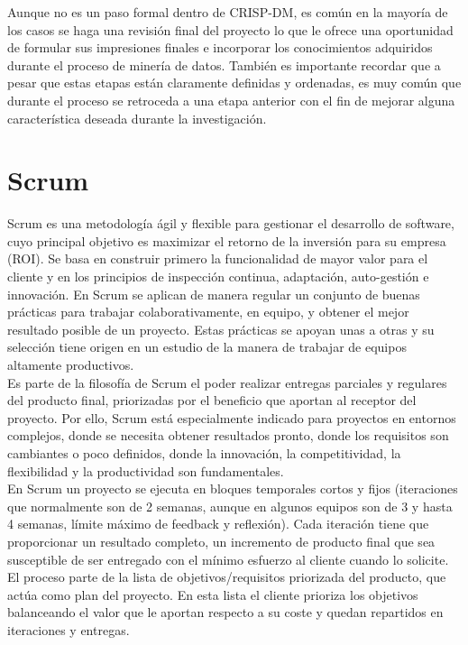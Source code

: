 Aunque no es un paso formal dentro de CRISP-DM, es común en la mayoría de los casos se haga una revisión final del proyecto lo que le ofrece una oportunidad de formular sus impresiones finales e incorporar los conocimientos adquiridos durante el proceso de minería de datos. También es importante recordar que a pesar que estas etapas están claramente definidas  y ordenadas, es muy común que durante el proceso se retroceda a una etapa anterior con el fin de mejorar alguna característica deseada durante la investigación.

\section{Scrum}

Scrum es una metodología ágil y flexible para gestionar el desarrollo de software, cuyo principal objetivo es maximizar el retorno de la inversión para su empresa (ROI). Se basa en construir primero la funcionalidad de mayor valor para el cliente y en los principios de inspección continua, adaptación, auto-gestión e innovación.\cite{scrumsofteng} En Scrum se aplican de manera regular un conjunto de buenas prácticas para trabajar colaborativamente, en equipo, y obtener el mejor resultado posible de un proyecto. Estas prácticas se apoyan unas a otras y su selección tiene origen en un estudio de la manera de trabajar de equipos altamente productivos.\cite{scrumproyecto}\\

Es parte de la filosofía de Scrum el poder realizar entregas parciales y regulares del producto final, priorizadas por el beneficio que aportan al receptor del proyecto. Por ello, Scrum está especialmente indicado para proyectos en entornos complejos, donde se necesita obtener resultados pronto, donde los requisitos son cambiantes o poco definidos, donde la innovación, la competitividad, la flexibilidad y la productividad son fundamentales.\\

En Scrum un proyecto se ejecuta en bloques temporales cortos y fijos (iteraciones que normalmente son de 2 semanas, aunque en algunos equipos son de 3 y hasta 4 semanas, límite máximo de feedback y reflexión). Cada iteración tiene que proporcionar un resultado completo, un incremento de producto final que sea susceptible de ser entregado con el mínimo esfuerzo al cliente cuando lo solicite. El proceso parte de la lista de objetivos/requisitos priorizada del producto, que actúa como plan del proyecto. En esta lista el cliente prioriza los objetivos balanceando el valor que le aportan respecto a su coste y quedan repartidos en iteraciones y entregas.\\  

